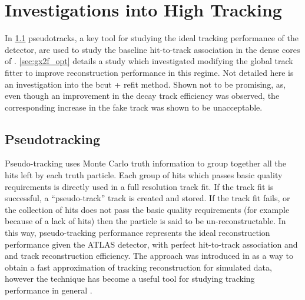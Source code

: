 \section{Investigations into High \texorpdfstring{\pT}{pT} \bhadron Tracking}\label{sec:b_track_reco_improvements}

In \cref{sec:pseudotracks} pseudotracks, a key tool for studying the ideal tracking performance of the \ATLAS detector, are used to study the baseline hit-to-track association in the dense cores of \highpt \bjets.
\cref{sec:gx2f_opt} details a study which investigated modifying the global track fitter to improve reconstruction performance in this regime.
Not detailed here is an investigation into the bcut + refit method. Shown not to be promising, as, even though an improvement in the \bhadron decay track efficiency was observed, the corresponding increase in the fake track was shown to be unacceptable.


\subsection{Pseudotracking}\label{sec:pseudotracks}

Pseudo-tracking uses Monte Carlo truth information to group together all the hits left by each truth particle.
Each group of hits which passes basic quality requirements is directly used in a full resolution track fit.
If the track fit is successful, a ``pseudo-track'' track is created and stored.
If the track fit fails, or the collection of hits does not pass the basic quality requirements (for example because of a lack of hits) then the particle is said to be un-reconstructable.
In this way, pseudo-tracking performance represents the ideal reconstruction performance given the ATLAS detector, with perfect hit-to-track association and and track reconstruction efficiency.
The approach was introduced in \cite{Jansky:2013ryb} as a way to obtain a fast approximation of tracking reconstruction for simulated data, however the technique has become a useful tool for studying tracking performance in general \cite{ATL-PHYS-PUB-2015-006}.

